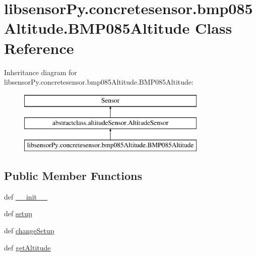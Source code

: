\hypertarget{classlibsensorPy_1_1concretesensor_1_1bmp085Altitude_1_1BMP085Altitude}{}\section{libsensor\+Py.\+concretesensor.\+bmp085\+Altitude.\+B\+M\+P085\+Altitude Class Reference}
\label{classlibsensorPy_1_1concretesensor_1_1bmp085Altitude_1_1BMP085Altitude}
Inheritance diagram for libsensor\+Py.\+concretesensor.\+bmp085\+Altitude.\+B\+M\+P085\+Altitude\+:\begin{figure}[H]
\begin{center}
\leavevmode
\includegraphics[height=3.000000cm]{classlibsensorPy_1_1concretesensor_1_1bmp085Altitude_1_1BMP085Altitude}
\end{center}
\end{figure}
\subsection*{Public Member Functions}
\begin{DoxyCompactItemize}
\item 
def \hyperlink{classlibsensorPy_1_1concretesensor_1_1bmp085Altitude_1_1BMP085Altitude_a555514a714a0a3aed5712e8ac5721d28}{\+\_\+\+\_\+init\+\_\+\+\_\+}
\item 
def \hyperlink{classlibsensorPy_1_1concretesensor_1_1bmp085Altitude_1_1BMP085Altitude_a641628185ea9580e49868591f071bd7d}{setup}
\item 
def \hyperlink{classlibsensorPy_1_1concretesensor_1_1bmp085Altitude_1_1BMP085Altitude_ad66554bb9ea46d4e837f20d6b20291d4}{change\+Setup}
\item 
def \hyperlink{classlibsensorPy_1_1concretesensor_1_1bmp085Altitude_1_1BMP085Altitude_a55e1bd8c1c7fd4fcb82f4e0e8b6e5883}{get\+Altitude}
\end{DoxyCompactItemize}
